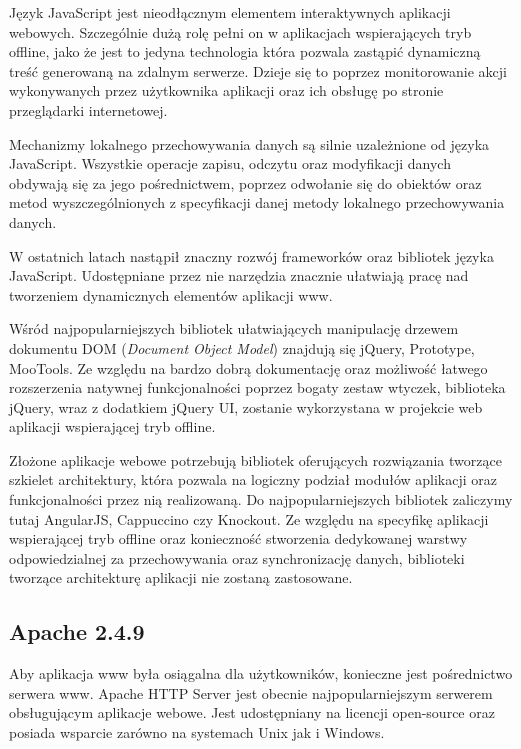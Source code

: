 Język JavaScript jest nieodłącznym elementem interaktywnych aplikacji webowych. Szczególnie dużą rolę pełni on w aplikacjach wspierających tryb offline, jako że jest to jedyna technologia która pozwala zastąpić dynamiczną treść generowaną na zdalnym serwerze. Dzieje się to poprzez monitorowanie akcji wykonywanych przez użytkownika aplikacji oraz ich obsługę po stronie przeglądarki internetowej.

Mechanizmy lokalnego przechowywania danych są silnie uzależnione od języka JavaScript. Wszystkie operacje zapisu, odczytu oraz modyfikacji danych obdywają się za jego pośrednictwem, poprzez odwołanie się do obiektów oraz metod wyszczególnionych z specyfikacji danej metody lokalnego przechowywania danych.

W ostatnich latach nastąpił znaczny rozwój frameworków oraz bibliotek języka JavaScript. Udostępniane przez nie narzędzia znacznie ułatwiają pracę nad tworzeniem dynamicznych elementów aplikacji www.

Wśród najpopularniejszych bibliotek ułatwiających manipulację drzewem dokumentu DOM (\emph{Document Object Model}) znajdują się jQuery, Prototype, MooTools. Ze względu na bardzo dobrą dokumentację oraz możliwość łatwego rozszerzenia natywnej funkcjonalności poprzez bogaty zestaw wtyczek, biblioteka jQuery, wraz z dodatkiem jQuery UI, zostanie wykorzystana w projekcie web aplikacji wspierającej tryb offline.

Złożone aplikacje webowe potrzebują bibliotek oferujących rozwiązania tworzące szkielet architektury, która pozwala na logiczny podział modułów aplikacji oraz funkcjonalności przez nią realizowaną. Do najpopularniejszych bibliotek zaliczymy tutaj AngularJS, Cappuccino czy Knockout. Ze względu na specyfikę aplikacji wspierającej tryb offline oraz konieczność stworzenia dedykowanej warstwy odpowiedzialnej za przechowywania oraz synchronizację danych, biblioteki tworzące architekturę aplikacji nie zostaną zastosowane.

\subsection{Apache 2.4.9}
\label{sec:apache}

Aby aplikacja www była osiągalna dla użytkowników, konieczne jest pośrednictwo serwera www. Apache HTTP Server jest obecnie najpopularniejszym serwerem obsługującym aplikacje webowe. Jest udostępniany na licencji open-source oraz posiada wsparcie zarówno na systemach Unix jak i Windows.

